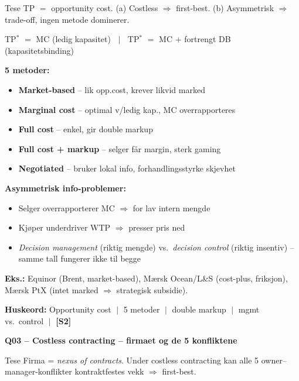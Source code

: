 \documentclass[10pt, a4paper]{article}
\newcommand{\STwo}{\textcolor{s2color}{\textbf{[S2]}}}
\newcommand{\qhead}[2]{%
  \noindent
  \begin{tcolorbox}[colback=boxborder, colframe=boxborder, arc=2pt, left=6pt, right=6pt, top=2pt, bottom=2pt]
    \color{white}\textbf{\large Q#1 -- #2}
  \end{tcolorbox}
}
\newcommand{\huskeord}[1]{%
  \vspace{2pt}
  \begin{tcolorbox}[colback=yellow!15, colframe=orange!70!black, boxrule=0.4pt, arc=2pt, left=4pt, right=4pt, top=2pt, bottom=2pt]
    \footnotesize\textbf{Huskeord:} #1
  \end{tcolorbox}
}
\begin{document}
\begin{keybox}{Tese}
TP $=$ opportunity cost. (a) Costless $\Rightarrow$ first-best. (b) Asymmetrisk $\Rightarrow$ trade-off, ingen metode dominerer.
\end{keybox}

\begin{formulabox}
TP$^{*}$ $=$ MC (ledig kapasitet) $\;\;\big|\;\;$ TP$^{*}$ $=$ MC $+$ fortrengt DB (kapasitetsbinding)
\end{formulabox}

\textbf{5 metoder:}
\begin{itemize}
  \item \textbf{Market-based} -- lik opp.cost, krever likvid marked
  \item \textbf{Marginal cost} -- optimal v/ledig kap., MC overrapporteres
  \item \textbf{Full cost} -- enkel, gir double markup
  \item \textbf{Full cost + markup} -- selger får margin, sterk gaming
  \item \textbf{Negotiated} -- bruker lokal info, forhandlingsstyrke skjevhet
\end{itemize}

\textbf{Asymmetrisk info-problemer:}
\begin{itemize}
  \item Selger overrapporterer MC $\Rightarrow$ for lav intern mengde
  \item Kjøper underdriver WTP $\Rightarrow$ presser pris ned
  \item \emph{Decision management} (riktig mengde) vs.\ \emph{decision control} (riktig insentiv) -- samme tall fungerer ikke til begge
\end{itemize}

\textbf{Eks.:} Equinor (Brent, market-based), Mærsk Ocean/L\&S (cost-plus, friksjon), Mærsk PtX (intet marked $\Rightarrow$ strategisk subsidie).

\huskeord{Opportunity cost $\;\big|\;$ 5 metoder $\;\big|\;$ double markup $\;\big|\;$ mgmt vs.\ control $\;\big|\;$ \STwo}

\vfill\newpage

\qhead{03}{Costless contracting -- firmaet og de 5 konfliktene}

\begin{keybox}{Tese}
Firma = \emph{nexus of contracts}. Under costless contracting kan alle 5 owner--manager-konflikter kontraktfestes vekk $\Rightarrow$ first-best.
\end{keybox}
\end{document}
